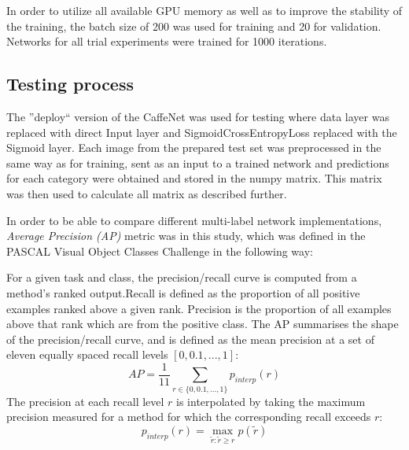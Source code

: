     In order to utilize all available GPU memory as well as to improve the stability of the training, the batch size of 200 was used for training and 20 for validation. Networks for all trial experiments were trained for 1000 iterations.
    
    
    
    
    \subsection{Testing process}
    The ''deploy`` version of the CaffeNet was used for testing where data layer was replaced with direct Input layer and SigmoidCrossEntropyLoss replaced with the Sigmoid layer. Each image from the prepared test set was preprocessed in the same way as for training, sent as an input to a trained network and predictions for each category were obtained and stored in the numpy matrix. This matrix was then used to calculate all matrix as described further.
    
    In order to be able to compare different multi-label network implementations, \textit{Average Precision (AP)} metric was in this study, which was defined in the PASCAL Visual Object Classes Challenge \cite{Everingham2010PASCAL-VOC} in the following way:
    
    \begin{displayquote}
    For a given task and class, the precision/recall curve is computed from a method’s ranked output.Recall is defined as the proportion of all positive examples ranked above a given rank. Precision is the proportion of all examples above that rank which are from the positive class. The AP summarises the shape of the precision/recall curve, and is defined as the mean precision at a set of eleven equally spaced recall levels $[0,0.1, . . . ,1]$:
    $$
    AP = \frac{1}{11} \sum_{r \in \{0, 0.1, ..., 1\}} p_{interp}(r)
    $$
    The precision at each recall level $r$ is interpolated by taking the maximum precision measured for a method for which the corresponding recall exceeds $r$:
    $$
    p_{interp}(r) = \max_{\tilde{r}:\tilde{r} \ge r} p(\tilde{r})
    $$
    \end{displayquote}
    

